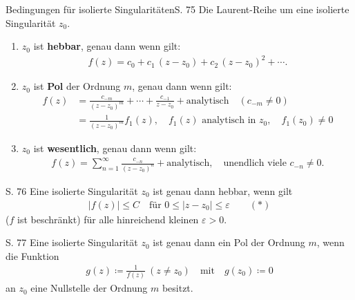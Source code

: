 \begin{bemerkung}{Bedingungen für isolierte Singularitäten}{S. 75}
  Die Laurent-Reihe um eine isolierte Singularität $z_0$.
  \begin{enumerate}[label=\alph*)]
    \item $z_0$ ist \textbf{hebbar}, genau dann wenn gilt:
      \begin{align}
        f(z) = c_0 + c_1\,(z-z_0) + c_2\,(z-z_0)^2 + \cdots .
      \end{align}
    \item $z_0$ ist \textbf{Pol} der Ordnung $m$, genau dann wenn gilt:
      \begin{align}
        f(z)
        &= \frac{c_{-m}}{(z-z_0)^m} + \cdots + \frac{c_{-1}}{z-z_0} + \text{analytisch} \quad (c_{-m} \neq 0) \\
        &= \frac{1}{(z-z_0)^m} f_1(z), \quad f_1(z) \text{ analytisch in } z_0, \quad f_1(z_0) \neq 0
      \end{align}
    \item $z_0$ ist \textbf{wesentlich}, genau dann wenn gilt:
      \begin{align}
        f(z) = \sum_{n=1}^{\infty} \frac{c_{-n}}{(z-z_0)^n} + \text{analytisch}, \quad \text{unendlich viele } c_{-n} \neq 0.
      \end{align}
  \end{enumerate}
\end{bemerkung}

\begin{satz}{S. 76}
  \label{satz:7_2}
  Eine isolierte Singularität $z_0$ ist genau dann hebbar, wenn gilt
  \begin{align}
    \left| f(z) \right| \leq C \quad \text{für } 0 \leq | z-z_0| \leq \varepsilon \qquad (*)
  \end{align}
  ($f$ ist beschränkt) für alle hinreichend kleinen $\varepsilon > 0$.
\end{satz}

\begin{satz}{S. 77}
  \label{satz:7_3}
  Eine isolierte Singularität $z_0$ ist genau dann ein Pol der Ordnung $m$, wenn die Funktion
  \begin{align}
    g(z) \coloneqq \frac{1}{f(z)} \ (z \neq z_0) \quad \text{mit} \quad g(z_0) \coloneqq 0
  \end{align}
  an $z_0$ eine Nullstelle der Ordnung $m$ besitzt.
\end{satz}

